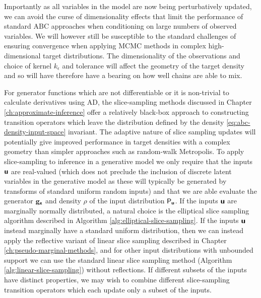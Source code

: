 Importantly as all variables in the model are now being perturbatively updated, we can avoid the curse of dimensionality effects that limit the performance of standard \ac{ABC} approaches when conditioning on large numbers of observed variables. We will however still be susceptible to the standard challenges of ensuring convergence when applying \ac{MCMC} methods in complex high-dimensional target distributions. The dimensionality of the observations and choice of kernel $k_\epsilon$ and tolerance will affect the geometry of the target density and so will have therefore have a bearing on how well chains are able to mix.

For generator functions which are not differentiable or it is non-trivial to calculate derivatives using \ac{AD}, the slice-sampling methods discussed in Chapter \ref{ch:approximate-inference} offer a relatively black-box approach to constructing transition operators which leave the distribution defined by the density \eqref{eq:abc-density-input-space} invariant. The adaptive nature of slice sampling updates will potentially give improved performance in target densities with a complex geometry than simpler approaches such as random-walk Metropolis. To apply slice-sampling to inference in a generative model we only require that the inputs $\boldsymbol{\mathsf{u}}$ are real-valued (which does not preclude the inclusion of discrete latent variables in the generative model as these will typically be generated by transforms of standard uniform random inputs) and that we are able evaluate the generator ${\mathbf{g}}_{\boldsymbol{\mathsf{x}}}$ and density $\rho$ of the input distribution $\mathsf{P}_{\boldsymbol{\mathsf{u}}}$. If the inputs $\boldsymbol{\mathsf{u}}$ are marginally normally distributed, a natural choice is the elliptical slice sampling algorithm described in Algorithm \ref{alg:elliptical-slice-sampling}. If the inputs $\boldsymbol{\mathsf{u}}$ instead marginally have a standard uniform distribution, then we can instead apply the reflective variant of linear slice sampling described in Chapter \ref{ch:pseudo-marginal-methods}, and for other input distributions with unbounded support we can use the standard linear slice sampling method (Algorithm \ref{alg:linear-slice-sampling}) without reflections. If different subsets of the inputs have distinct properties, we may wish to combine different slice-sampling transition operators which each update only a subset of the inputs.

